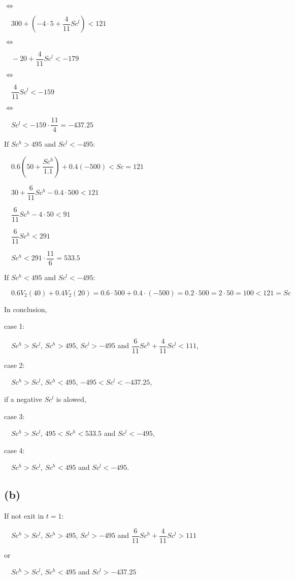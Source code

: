 \documentclass{article}
\begin{document}
$\iff$

$\quad 300+\left(-4\cdot5+\dfrac{4}{11}Sc^{l}\right)<121$

$\iff$

$\quad -20+\dfrac{4}{11}Sc^{l}<-179$

$\iff$

$\quad \dfrac{4}{11}Sc^{l}<-159$

$\iff$

$\quad Sc^{l}<-159\cdot\dfrac{11}{4}=-437.25$

If $Sc^{h}>495$ and $Sc^{l}<-495$:

$\quad 0.6\left(50+\dfrac{Sc^{h}}{1.1}\right)+0.4\left(-500\right)<Sc=121$

$\quad 30+\dfrac{6}{11}Sc^{h}-0.4\cdot500<121$

$\quad \dfrac{6}{11}Sc^{h}-4\cdot50<91$

$\quad \dfrac{6}{11}Sc^{h}<291$

$\quad Sc^{h}<291\cdot\dfrac{11}{6}=533.5$

If $Sc^{h}<495$ and $Sc^{l}<-495$:

$\quad 0.6V_{2}\left(40\right)+0.4V_{2}\left(20\right)=0.6\cdot500+0.4\cdot\left(-500\right)=0.2\cdot500=2\cdot50=100<121=Sc$

In conclusion, 

case 1:

$\quad Sc^{h}>Sc^{l}$, $Sc^{h}>495$, $Sc^{l}>-495$ and $\dfrac{6}{11}Sc^{h}+\dfrac{4}{11}Sc^{l}<111$,

case 2:

$\quad Sc^{h}>Sc^{l}$, $Sc^{h}<495$, $-495<Sc^{l}<-437.25$,

if a negative $Sc^{l}$ is alowed,

case 3:

$\quad Sc^{h}>Sc^{l}$, $495<Sc^{h}<533.5$ and $Sc^{l}<-495$,

case 4:

$\quad Sc^{h}>Sc^{l}$, $Sc^{h}<495$ and $Sc^{l}<-495$.

\subsection*{(b)}

If not exit in $t=1$:

$\quad Sc^{h}>Sc^{l}$, $Sc^{h}>495$, $Sc^{l}>-495$ and $\dfrac{6}{11}Sc^{h}+\dfrac{4}{11}Sc^{l}>111$

or 

$\quad Sc^{h}>Sc^{l}$, $Sc^{h}<495$ and $Sc^{l}>-437.25$
\end{document}
